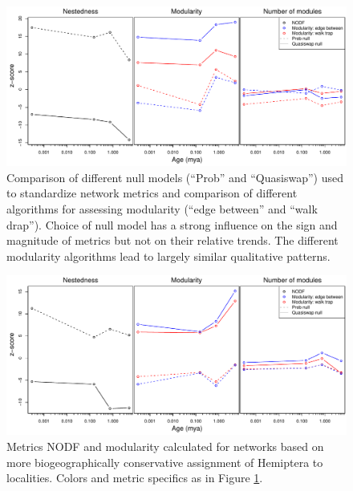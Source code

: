 \documentclass[12pt]{article}
\begin{document}
\begin{figure}[!hp]
  \centering
  \includegraphics[scale=0.6]{figSupp_netMetComp.pdf}
  \caption{Comparison of different null models (``Prob'' and
    ``Quasiswap'') used to standardize network metrics and comparison
    of different algorithms for assessing modularity (``edge between''
    and ``walk drap''). Choice of null model has a strong influence
    on the sign and magnitude of metrics but not on their relative
    trends. The different modularity algorithms lead to largely
    similar qualitative patterns.}
  \label{figSupp:netMetComp}
\end{figure}

\begin{figure}[!hp]
  \centering
  \includegraphics[scale=0.6]{figSupp_netMetCons.pdf}
  \caption{Metrics NODF and modularity calculated for networks based
    on more biogeographically conservative assignment of Hemiptera to
    localities. Colors and metric specifics as in Figure
    \ref{figSupp:netMetComp}.}
  \label{figSupp:netCons}
\end{figure}
\end{document}
